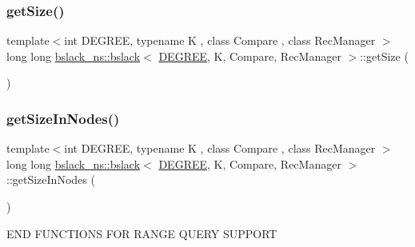 \mbox{\label{classbslack__ns_1_1bslack_a8f52a836192f30c567310f13c3671dc5}} 
\subsubsection{\texorpdfstring{get\+Size()}{getSize()}\hspace{0.1cm}{\footnotesize\ttfamily [2/2]}}
{\footnotesize\ttfamily template$<$int D\+E\+G\+R\+EE, typename K , class Compare , class Rec\+Manager $>$ \\
long long \hyperlink{classbslack__ns_1_1bslack}{bslack\+\_\+ns\+::bslack}$<$ \hyperlink{brown__sigouin__abtree__kcas_2adapter_8h_a5d88b17d70c985f2f2b8e987037fd6dd}{D\+E\+G\+R\+EE}, K, Compare, Rec\+Manager $>$\+::get\+Size (\begin{DoxyParamCaption}{ }\end{DoxyParamCaption})\hspace{0.3cm}{\ttfamily [inline]}}

\mbox{\label{classbslack__ns_1_1bslack_a0bb2cef6032ebe936b94b2adb2e93577}} 
\subsubsection{\texorpdfstring{get\+Size\+In\+Nodes()}{getSizeInNodes()}}
{\footnotesize\ttfamily template$<$int D\+E\+G\+R\+EE, typename K , class Compare , class Rec\+Manager $>$ \\
long long \hyperlink{classbslack__ns_1_1bslack}{bslack\+\_\+ns\+::bslack}$<$ \hyperlink{brown__sigouin__abtree__kcas_2adapter_8h_a5d88b17d70c985f2f2b8e987037fd6dd}{D\+E\+G\+R\+EE}, K, Compare, Rec\+Manager $>$\+::get\+Size\+In\+Nodes (\begin{DoxyParamCaption}{ }\end{DoxyParamCaption})\hspace{0.3cm}{\ttfamily [inline]}}

E\+ND F\+U\+N\+C\+T\+I\+O\+NS F\+OR R\+A\+N\+GE Q\+U\+E\+RY S\+U\+P\+P\+O\+RT \mbox{\label{classbslack__ns_1_1bslack_a0d5afea1ea96699cefc93a724f98e2a9}} 
